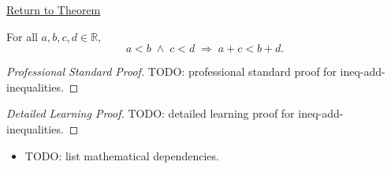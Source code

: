 \newpage
{}
\label{prf:ineq-add-inequalities}

\begin{remark*}[Return]
\hyperref[thm:ineq-add-inequalities]{Return to Theorem}
\end{remark*}

\begin{theorem*}
For all $a, b, c, d \in \mathbb{R}$,
\[
  a < b \;\land\; c < d \;\Rightarrow\; a + c < b + d.
\]
\end{theorem*}

\begin{proof}[Professional Standard Proof]
\LRAProofBodyStart
TODO: professional standard proof for ineq-add-inequalities.
\end{proof}

\begin{proof}[Detailed Learning Proof]
\LRAProofBodyStart
TODO: detailed learning proof for ineq-add-inequalities.
\end{proof}

\begin{remark*}
\end{remark*}

\begin{dependencies}
\begin{itemize}
  \item TODO: list mathematical dependencies.
\end{itemize}
\end{dependencies}

\clearpage

